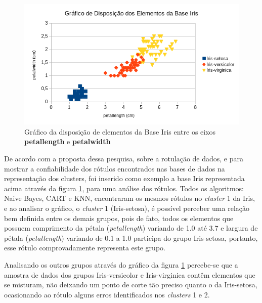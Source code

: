 \begin{figure}[h!]
        \centering
        \includegraphics[scale=0.9]{figs/grafico_iris_petalwidth_petallength_BrOf.png}
        \caption{Gráfico da disposição de elementos da Base Iris entre os eixos \textbf{petallength} e \textbf{petalwidth}} \label{fig:grafico_iris_petalwidth_petallength_BrOf}
\end{figure}

De acordo com a proposta dessa pesquisa, sobre a rotulação de dados, e para mostrar a confiabilidade dos rótulos encontrados nas bases de dados na representação dos clusters, foi inserido como exemplo a base Iris representada acima através da figura \ref{fig:grafico_iris_petalwidth_petallength_BrOf}, para uma análise dos rótulos. Todos os algoritmos: Naive Bayes, CART e KNN, encontraram os mesmos rótulos no \textit{cluster} 1 da Iris, e ao analisar o gráfico, o \textit{cluster} 1 (Iris-setosa), é possível perceber uma relação bem definida entre os demais grupos, pois de fato, todos os elementos que possuem comprimento da pétala (\textit{petallength}) variando de 1.0 até 3.7 e largura de pétala (\textit{petallength}) variando de 0.1 a 1.0 participa do grupo Iris-setosa, portanto, esse rótulo comprovadamente representa este grupo.

Analisando os outros grupos através do gráfico da figura \ref{fig:grafico_iris_petalwidth_petallength_BrOf} percebe-se que a amostra de dados dos grupos Iris-versicolor e Iris-virginica contêm elementos que se misturam, não deixando um ponto de corte tão preciso quanto o da Iris-setosa, ocasionando ao rótulo alguns erros identificados nos \textit{clusters} 1 e 2.
